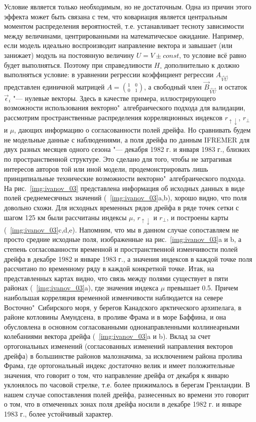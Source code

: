 Условие  является только необходимым, но не достаточным. Одна из причин этого эффекта может быть связана с тем, что ковариация является центральным моментом распределения вероятностей, т.е. устанавливает тесноту зависимости между величинами, центрированными на математическое ожидание. Например, если модель идеально воспроизводит направление вектора  и завышает (или занижает) модуль на постоянную величину $U=V\pm{const}$, то условие  всё равно будет выполняться. Поэтому при справедливости $H_{\circ}$ дополнительно к  должно выполняться условие: в уравнении регрессии  коэффициент регрессии $A_{\vec{V}\vec{U}}$ представлен единичной матрицей $A={{1}\quad {0}\choose {0}\quad {1}}$, а свободный член $\vec{B}_{\vec{V}\vec{U}}$ и остаток $\vec{\epsilon}_{i}$ "--- нулевые векторы.
Здесь в качестве примера, иллюстрирующего возможности использования векторно"~алгебраического подхода для валидации, рассмотрим пространственные распределения корреляционных индексов $r_{\uparrow\downarrow}$, $r_{\perp}$ и $\mu$, дающих информацию о согласованности полей дрейфа. Но сравнивать будем не модельные данные с наблюдениями, а поля дрейфа по данным IFREMER для двух разных месяцев одного сезона "--- декабря 1982 г. и января 1983 г., близких по пространственной структуре. Это сделано для того, чтобы не затрагивая интересов авторов той или иной модели, продемонстрировать лишь принципиальные технические возможности векторно"~алгебраического подхода.
На рис.~\ref{img:ivanov_03} представлена информация об исходных данных в виде полей среднемесячных значений (~\ref{img:ivanov_03}a,b), хорошо видно, что поля довольно схожи. Для исходных временных рядов дрейфа в ряде точек сетки с шагом 125 км были рассчитаны индексы $\mu$, $r_{\uparrow\downarrow}$ и $r_{\perp}$, и построены карты (~\ref{img:ivanov_03}c,d,e). Напомним, что мы в данном случае сопоставляем не просто средние исходные поля, изображенные на рис.~\ref{img:ivanov_03}a и b, а степень согласованности временной и пространственной изменчивости полей дрейфа в декабре 1982 и январе 1983 г., а значения индексов в каждой точке поля рассчитано по временному ряду в каждой конкретной точке.
Итак, на представленных картах видно, что связь между полями существует в пяти районах (~\ref{img:ivanov_03}a), где значения индекса $\mu$ превышает 0.5. Причем наибольшая корреляция временной изменчивости наблюдается на севере Восточно"~Сибирского моря, у берегов Канадского арктического архипелага, в районе котловины Амундсена, в проливе Фрама и в море Баффина, и она обусловлена в основном согласованными однонаправленными коллинеарными колебаниями вектора дрейфа (~\ref{img:ivanov_03}a и b). Вклад за счет ортогональных изменений (согласованных изменений направления векторов дрейфа) в большинстве районов малозначима, за исключением района пролива Фрама, где ортогональный индекс достаточно велик и имеет положительные значения, что говорит о том, что направление дрейфа от декабря к январю уклонялось по часовой стрелке, т.е. более прижималось в берегам Гренландии. В нашем случае сопоставления полей дрейфа, разнесенных во времени это говорит о том, что в отмеченных зонах поля дрейфа носили в декабре 1982 г. и январе 1983 г., более устойчивый характер. 
